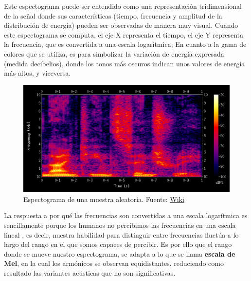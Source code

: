 \documentclass[11pt,a4paper,spanish]{book}
\begin{document}
	
	Este espectograma puede ser entendido como una representación tridimensional de la señal donde sus características (tiempo, frecuencia y amplitud de la distribución de energía) pueden ser observadas de manera muy visual. Cuando este espectograma se computa, el eje X representa el tiempo, el eje Y representa la frecuencia, que es convertida a una escala logarítmica; En cuanto a la gama de colores que se utiliza, es para simbolizar la variación de energía expresada (medida decibelios), donde los tonos más oscuros indican unos valores de energía más altos, y viceversa.
	
	\begin{figure}[h]
		\centering
		\includegraphics[scale=0.3]{spectogram.png} 
		\caption{Espectograma de una muestra aleatoria. Fuente: \href{https://es.other.wiki/wiki/Spectrogram}{Wiki}}
	\end{figure}
	
	La respuesta a por qué las frecuencias son convertidas a una escala logarítmica es sencillamente porque los humanos no percibimos las frecuencias en una escala lineal \cite{Varshney}, es decir, nuestra habilidad para distinguir entre frecuencias fluctúa a lo largo del rango en el que somos capaces de percibir\cite{StevensVolkmann}. Es por ello que el rango donde se mueve nuestro espectograma, se adapta a lo que se llama \textbf{escala de Mel}, en la cual los armónicos se observan equidistantes, reduciendo como resultado las variantes acústicas que no son significativas.\\
	
\end{document}
